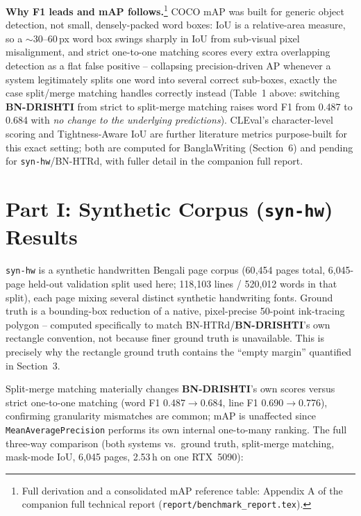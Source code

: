 \documentclass[10pt]{article}
\newcommand{\bnd}{\textbf{BN-DRISHTI}}
\begin{document}
\textbf{Why F1 leads and mAP follows.}\footnote{Full derivation and a consolidated mAP
reference table: Appendix A of the companion full technical report
(\texttt{report/benchmark\_report.tex}).} COCO mAP was built for generic object
detection, not small, densely-packed word boxes: IoU is a relative-area measure, so a
$\sim$30--60\,px word box swings sharply in IoU from sub-visual pixel misalignment, and
strict one-to-one matching scores every extra overlapping detection as a flat false
positive -- collapsing precision-driven AP whenever a system legitimately splits one
word into several correct sub-boxes, exactly the case split/merge matching handles
correctly instead (Table~1 above: switching \bnd{} from strict to split-merge matching
raises word F1 from 0.487 to 0.684 with \emph{no change to the underlying
predictions}). CLEval's character-level scoring \cite{baek2020cleval} and
Tightness-Aware IoU \cite{liu2019tiou} are further literature metrics purpose-built for
this exact setting; both are computed for BanglaWriting (Section~6) and pending for
\texttt{syn-hw}/BN-HTRd, with fuller detail in the companion full report.

\section{Part I: Synthetic Corpus (\texttt{syn-hw}) Results}

\texttt{syn-hw} is a synthetic handwritten Bengali page corpus (60{,}454 pages total,
6{,}045-page held-out validation split used here; 118{,}103 lines / 520{,}012 words in
that split), each page mixing several distinct synthetic handwriting fonts. Ground
truth is a bounding-box reduction of a native, pixel-precise 50-point ink-tracing
polygon -- computed specifically to match BN-HTRd/\bnd's own rectangle convention, not
because finer ground truth is unavailable. This is precisely why the rectangle ground
truth contains the ``empty margin'' quantified in Section~3.

Split-merge matching materially changes \bnd's own scores versus strict one-to-one
matching (word F1 0.487$\to$0.684, line F1 0.690$\to$0.776), confirming granularity
mismatches are common; mAP is unaffected since \texttt{MeanAveragePrecision} performs
its own internal one-to-many ranking. The full three-way comparison (both systems vs.\
ground truth, split-merge matching, mask-mode IoU, 6{,}045 pages, 2.53\,h on one
RTX~5090):
\end{document}
